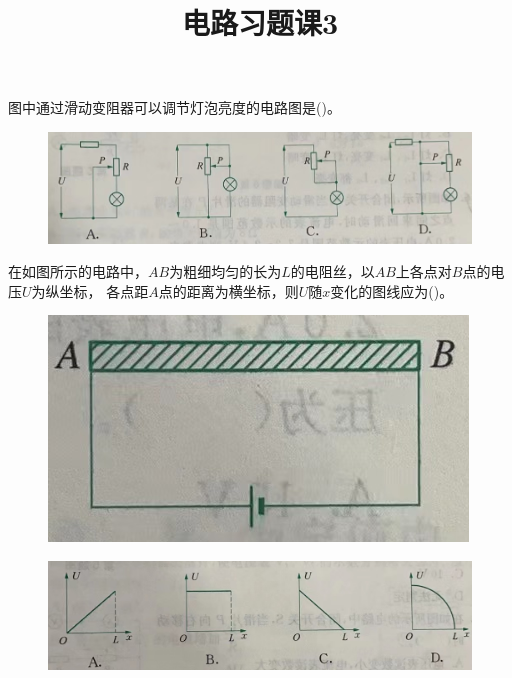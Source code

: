 \documentclass[a4paper,cs4size]{BHCexam}
\title{电路习题课3}
\begin{document}
\maketitle
\begin{groups}

    \begin{questions}[]

        \question[5] 图中通过滑动变阻器可以调节灯泡亮度的电路图是(\quad\quad\quad)。
        \begin{figure}[htb]
            \includegraphics [scale=0.6,trim=0 0 0 0]{./image/physics_circuit3_1.png}
            \label{fig:fig_circuit3_1}
        \end{figure}
        \vspace{2.5cm}

        \question[5] 在如图所示的电路中，$AB$为粗细均匀的长为$L$的电阻丝，以$AB$上各点对$B$点的电压$U$为纵坐标，
        各点距$A$点的距离为横坐标，则$U$随$x$变化的图线应为(\quad\quad\quad)。
        \begin{figure}[htb]
            \flushright
            \includegraphics [scale=0.3,trim=0 0 0 0]{./image/physics_circuit3_2_1.png}
            \label{fig:fig_circuit3_2_1}
        \end{figure}
        \begin{figure}[htb]
            \includegraphics [scale=0.6,trim=0 0 0 0]{./image/physics_circuit3_2_2.png}
            \label{fig:fig_circuit3_2_2}
        \end{figure}
        \vspace{2.5cm}


\end{questions}
\end{groups}
\end{document}
